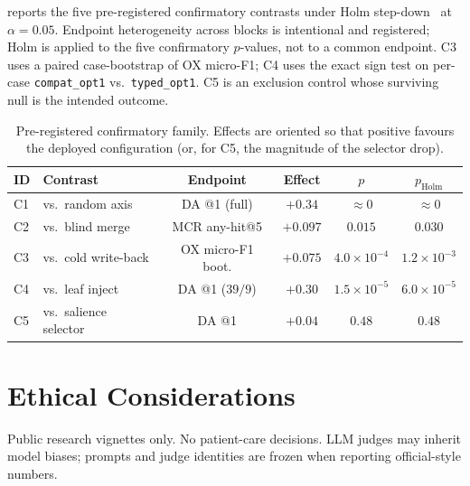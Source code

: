  reports the five pre-registered confirmatory contrasts under Holm step-down~\cite{holm1979} at $\alpha{=}0.05$.
Endpoint heterogeneity across blocks is intentional and registered; Holm is applied to the five confirmatory $p$-values, not to a common endpoint.
C3 uses a paired case-bootstrap of OX micro-F1; C4 uses the exact sign test on per-case \texttt{compat\_opt1} vs.\ \texttt{typed\_opt1}.
C5 is an exclusion control whose surviving null is the intended outcome.

\begin{table}[t]
\centering
\small
\caption{Pre-registered confirmatory family. Effects are oriented so that positive favours the deployed configuration (or, for C5, the magnitude of the selector drop).}
\label{tab:holm5}
\begin{tabular}{llcccc}
\toprule
ID & Contrast & Endpoint & Effect & $p$ & $p_{\mathrm{Holm}}$ \\
\midrule
C1 & vs.\ random axis & DA @1 (full) & $+0.34$ & ${\approx}0$ & ${\approx}0$ \\
C2 & vs.\ blind merge & MCR any-hit@5 & $+0.097$ & $0.015$ & $0.030$ \\
C3 & vs.\ cold write-back & OX micro-F1 boot. & $+0.075$ & $4.0{\times}10^{-4}$ & $1.2{\times}10^{-3}$ \\
C4 & vs.\ leaf inject & DA @1 ($39/9$) & $+0.30$ & $1.5{\times}10^{-5}$ & $6.0{\times}10^{-5}$ \\
C5 & vs.\ salience selector & DA @1 & $+0.04$ & $0.48$ & $0.48$ \\
\bottomrule
\end{tabular}
\end{table}

\section{Ethical Considerations}
\label{app:ethics}

Public research vignettes only.
No patient-care decisions.
LLM judges may inherit model biases; prompts and judge identities are frozen when reporting official-style numbers.
